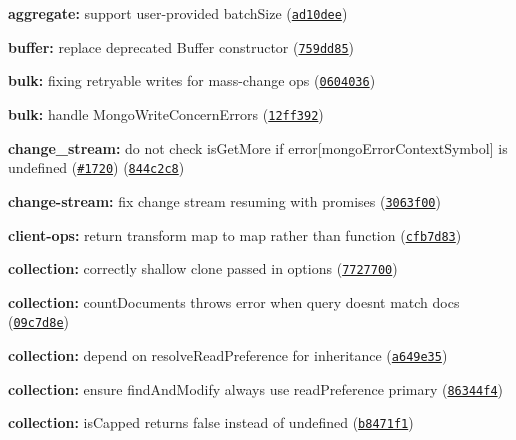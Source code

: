 \begin{DoxyItemize}
\item {\bfseries aggregate\+:} support user-\/provided {\ttfamily batch\+Size} (\href{https://github.com/mongodb/node-mongodb-native/commit/ad10dee}{\tt ad10dee})
\item {\bfseries buffer\+:} replace deprecated Buffer constructor (\href{https://github.com/mongodb/node-mongodb-native/commit/759dd85}{\tt 759dd85})
\item {\bfseries bulk\+:} fixing retryable writes for mass-\/change ops (\href{https://github.com/mongodb/node-mongodb-native/commit/0604036}{\tt 0604036})
\item {\bfseries bulk\+:} handle Mongo\+Write\+Concern\+Errors (\href{https://github.com/mongodb/node-mongodb-native/commit/12ff392}{\tt 12ff392})
\item {\bfseries change\+\_\+stream\+:} do not check is\+Get\+More if error\mbox{[}mongo\+Error\+Context\+Symbol\mbox{]} is undefined (\href{https://github.com/mongodb/node-mongodb-native/issues/1720}{\tt \#1720}) (\href{https://github.com/mongodb/node-mongodb-native/commit/844c2c8}{\tt 844c2c8})
\item {\bfseries change-\/stream\+:} fix change stream resuming with promises (\href{https://github.com/mongodb/node-mongodb-native/commit/3063f00}{\tt 3063f00})
\item {\bfseries client-\/ops\+:} return transform map to map rather than function (\href{https://github.com/mongodb/node-mongodb-native/commit/cfb7d83}{\tt cfb7d83})
\item {\bfseries collection\+:} correctly shallow clone passed in options (\href{https://github.com/mongodb/node-mongodb-native/commit/7727700}{\tt 7727700})
\item {\bfseries collection\+:} count\+Documents throws error when query doesn\textquotesingle{}t match docs (\href{https://github.com/mongodb/node-mongodb-native/commit/09c7d8e}{\tt 09c7d8e})
\item {\bfseries collection\+:} depend on {\ttfamily resolve\+Read\+Preference} for inheritance (\href{https://github.com/mongodb/node-mongodb-native/commit/a649e35}{\tt a649e35})
\item {\bfseries collection\+:} ensure find\+And\+Modify always use read\+Preference primary (\href{https://github.com/mongodb/node-mongodb-native/commit/86344f4}{\tt 86344f4})
\item {\bfseries collection\+:} is\+Capped returns false instead of undefined (\href{https://github.com/mongodb/node-mongodb-native/commit/b8471f1}{\tt b8471f1})

\end{DoxyItemize}
